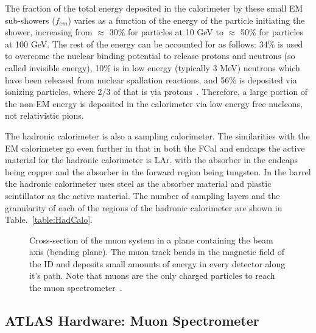 The fraction of the total energy deposited in the calorimeter by these small EM sub-showers ($f_{em}$) varies as a function of the energy of the particle initiating the shower, increasing from $\approx$ 30\% for particles at 10 GeV to $\approx$ 50\% for particles at 100 GeV.  
The rest of the energy can be accounted for as follows: 34\% is used to overcome the nuclear binding potential to release protons and neutrons (so called invisible energy), 10\% is in low energy (typically 3 MeV) neutrons which have been released from nuclear spallation reactions, and 56\% is deposited via ionizing particles, where 2/3 of that is via protons~\cite{Wigmans2008}.  
Therefore, a large portion of the non-EM energy is deposited in the calorimeter via low energy free nucleons, not relativistic pions.  

The hadronic calorimeter is also a sampling calorimeter.  
The similarities with the EM calorimeter go even further in that in both the FCal and endcaps the active material for the hadronic calorimeter is LAr, with the absorber in the endcaps being copper and the absorber in the forward region being tungsten.  
In the barrel the hadronic calorimeter uses steel as the absorber material and plastic scintillator as the active material.  
The number of sampling layers and the granularity of each of the regions of the hadronic calorimeter are shown in Table.~\ref{table:HadCalo}. 


\begin{figure}[!ht]
  \begin{center}
  \end{center}
  \caption[Grafic showing different particle interactions]
      {\small Cross-section of the muon system in a plane containing the beam axis (bending plane). The muon track bends in the magnetic field of the ID and deposits small amounts of energy in every detector along it's path.  Note that muons are the only charged particles to reach the muon spectrometer~\cite{JOIATLAS}.}
  \label{MuonSpectroFig}
\end{figure}


\subsection{ATLAS Hardware: Muon Spectrometer}

